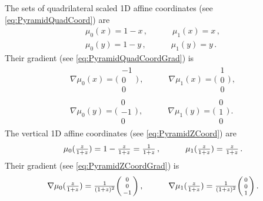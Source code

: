 The sets of quadrilateral scaled 1D affine coordinates (see \eqref{eq:PyramidQuadCoord}) are
\begin{equation}
	\begin{gathered}
		\mu_0(x)=1-x\,,\quad\qquad\mu_1(x)=x\,,\\
		\mu_0(y)=1-y\,,\quad\qquad\mu_1(y)=y\,.
	\end{gathered}
\end{equation}
Their gradient (see \eqref{eq:PyramidQuadCoordGrad}) is
\begin{equation}
	\begin{gathered}
		\nabla\mu_0(x)=\bigg(\begin{smallmatrix}-1\\[2pt]0\\[2pt]0\end{smallmatrix}\bigg)\,,\quad\qquad
    	\nabla\mu_1(x)=\bigg(\begin{smallmatrix}1\\[2pt]0\\[2pt]0\end{smallmatrix}\bigg)\,,\\
		\nabla\mu_0(y)=\bigg(\begin{smallmatrix}0\\[2pt]-1\\[2pt]0\end{smallmatrix}\bigg)\,,\quad\qquad
    	\nabla\mu_1(y)=\bigg(\begin{smallmatrix}0\\[2pt]1\\[2pt]0\end{smallmatrix}\bigg)\,.
	\end{gathered}
\end{equation}
The vertical 1D affine coordinates (see \eqref{eq:PyramidZCoord}) are
\begin{equation}
		\mu_0(\textstyle{\frac{z}{1+z}})=1-\textstyle{\frac{z}{1+z}}=\textstyle{\frac{1}{1+z}}\,,\quad\qquad\mu_1(\textstyle{\frac{z}{1+z}})=\textstyle{\frac{z}{1+z}}\,.
\end{equation}
Their gradient (see \eqref{eq:PyramidZCoordGrad}) is
\begin{equation}
		\nabla\mu_0(\textstyle{\frac{z}{1+z}})=\textstyle{\frac{1}{(1+z)^2}}\bigg(\begin{smallmatrix}0\\[2pt]0\\[2pt]-1\end{smallmatrix}\bigg)\,,\quad\qquad
			\nabla\mu_1(\textstyle{\frac{z}{1+z}})=\textstyle{\frac{1}{(1+z)^2}}\bigg(\begin{smallmatrix}0\\[2pt]0\\[2pt]1\end{smallmatrix}\bigg)\,.		
\end{equation}
